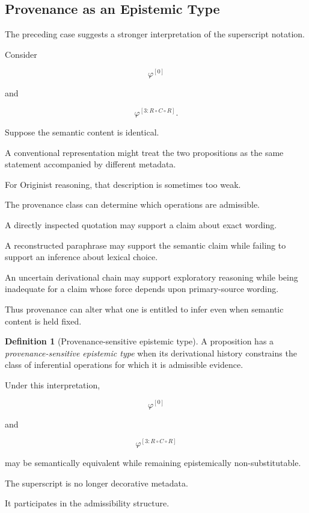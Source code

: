 \documentclass[
  11pt,
  a4paper,
  DIV=12,
  BCOR=0mm,
  parskip=half-
]{scrartcl}
\theoremstyle{definition}
\newtheorem{definition}{Definition}[section]
\theoremstyle{plain}
\theoremstyle{remark}
\begin{document}
\subsection{Provenance as an Epistemic Type}
\label{sec:epistemic-type}

The preceding case suggests a stronger interpretation of the superscript
notation.

Consider

\[
  \varphi^{[0]}
\]

and

\[
  \varphi^{[3:R\circ C\circ R]}.
\]

Suppose the semantic content is identical.

A conventional representation might treat the two propositions as the same
statement accompanied by different metadata.

For Originist reasoning, that description is sometimes too weak.

The provenance class can determine which operations are admissible.

A directly inspected quotation may support a claim about exact wording.

A reconstructed paraphrase may support the semantic claim while failing to
support an inference about lexical choice.

An uncertain derivational chain may support exploratory reasoning while being
inadequate for a claim whose force depends upon primary-source wording.

Thus provenance can alter what one is entitled to infer even when semantic
content is held fixed.

\begin{definition}[Provenance-sensitive epistemic type]
\label{def:epistemic-type}
A proposition has a \emph{provenance-sensitive epistemic type} when its
derivational history constrains the class of inferential operations for which
it is admissible evidence.
\end{definition}

Under this interpretation,

\[
  \varphi^{[0]}
\]

and

\[
  \varphi^{[3:R\circ C\circ R]}
\]

may be semantically equivalent while remaining epistemically non-substitutable.

The superscript is no longer decorative metadata.

It participates in the admissibility structure.
\end{document}
